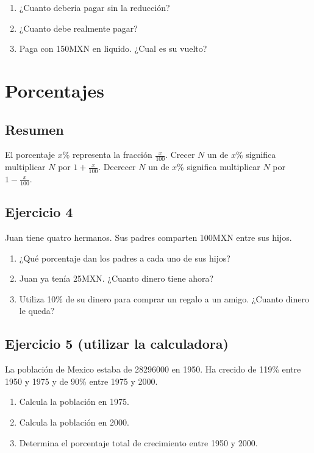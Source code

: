 \begin{enumerate}
\item ¿Cuanto deberia  pagar sin la reducción?
\item ¿Cuanto debe realmente pagar?
\item Paga con 150MXN en liquido. ¿Cual  es su vuelto?
\end{enumerate}

\section{Porcentajes}

\subsection*{Resumen}

El porcentaje $x$\% representa la fracción $\frac{x}{100}$. Crecer $N$ un
de $x$\% significa multiplicar $N$ por $1+\frac{x}{100}$. Decrecer $N$ un
de $x$\% significa multiplicar $N$ por $1-\frac{x}{100}$.

\subsection*{Ejercicio 4}

Juan tiene quatro hermanos. Sus padres comparten 100MXN entre sus hijos.

\begin{enumerate}
\item ¿Qué porcentaje dan los padres a cada uno de sus hijos?
\item Juan ya tenía 25MXN. ¿Cuanto dinero tiene ahora?
\item Utiliza 10\% de su dinero para comprar un regalo a un amigo. ¿Cuanto
  dinero le queda?
\end{enumerate}

\subsection*{Ejercicio 5 (utilizar la calculadora)}

La población de Mexico estaba de 28296000 en 1950. Ha crecido de 119\% entre
1950 y 1975 y de 90\% entre 1975 y 2000.

\begin{enumerate}
\item Calcula la población en 1975.
\item Calcula la población en 2000.
\item Determina el porcentaje total de crecimiento entre 1950 y 2000.
\end{enumerate}

